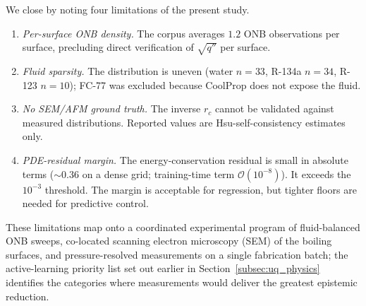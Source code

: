 We close by noting four limitations of the present study.

\begin{enumerate}
  \item \textit{Per-surface ONB density.} The corpus averages $1.2$ ONB
    observations per surface, precluding direct verification of
    $\sqrt{q''}$ per surface.
  \item \textit{Fluid sparsity.} The distribution is uneven (water $n=33$,
    R-134a $n=34$, R-123 $n=10$); FC-77 was excluded because CoolProp
    does not expose the fluid.
  \item \textit{No SEM/AFM ground truth.} The inverse $r_c$ cannot be
    validated against measured distributions. Reported values are
    Hsu-self-consistency estimates only.
  \item \textit{PDE-residual margin.} The energy-conservation
    residual is small in absolute terms ($\sim 0.36$ on a dense grid;
    training-time term $\mathcal{O}(10^{-8})$). It exceeds the
    $10^{-3}$ threshold. The margin is acceptable for regression, but
    tighter floors are needed for predictive control.
\end{enumerate}

These limitations map onto a coordinated experimental program of
fluid-balanced ONB sweeps, co-located scanning electron microscopy
(SEM) of the boiling surfaces, and pressure-resolved measurements on
a single fabrication batch; the active-learning priority list set
out earlier in Section~\ref{subsec:uq_physics} identifies the
categories where measurements would deliver the greatest epistemic
reduction.


